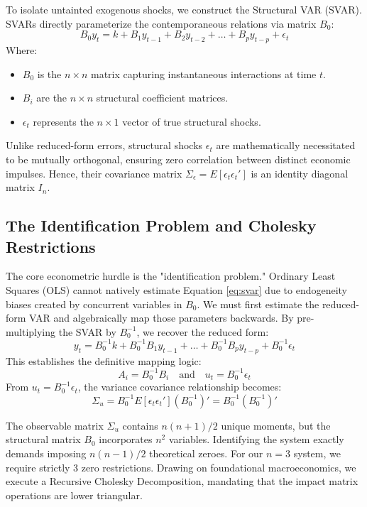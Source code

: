 \documentclass[12pt,a4paper]{report}
\begin{document}
To isolate untainted exogenous shocks, we construct the Structural VAR (SVAR). SVARs directly parameterize the contemporaneous relations via matrix $B_0$:
\begin{equation} \label{eq:svar}
B_0 y_t = k + B_1 y_{t-1} + B_2 y_{t-2} + \dots + B_p y_{t-p} + \epsilon_t
\end{equation}
Where:
\begin{itemize}
    \item $B_0$ is the $n \times n$ matrix capturing instantaneous interactions at time $t$.
    \item $B_i$ are the $n \times n$ structural coefficient matrices.
    \item $\epsilon_t$ represents the $n \times 1$ vector of true structural shocks.
\end{itemize}

Unlike reduced-form errors, structural shocks $\epsilon_t$ are mathematically necessitated to be mutually orthogonal, ensuring zero correlation between distinct economic impulses. Hence, their covariance matrix $\Sigma_\epsilon = E[\epsilon_t \epsilon_t']$ is an identity diagonal matrix $I_n$. 

\subsection{The Identification Problem and Cholesky Restrictions}
The core econometric hurdle is the "identification problem." Ordinary Least Squares (OLS) cannot natively estimate Equation \ref{eq:svar} due to endogeneity biases created by concurrent variables in $B_0$. We must first estimate the reduced-form VAR and algebraically map those parameters backwards. By pre-multiplying the SVAR by $B_0^{-1}$, we recover the reduced form:
\begin{equation}
y_t = B_0^{-1}k + B_0^{-1}B_1 y_{t-1} + \dots + B_0^{-1}B_p y_{t-p} + B_0^{-1}\epsilon_t
\end{equation}
This establishes the definitive mapping logic:
\begin{equation}
A_i = B_0^{-1}B_i \quad \text{and} \quad u_t = B_0^{-1}\epsilon_t
\end{equation}
From $u_t = B_0^{-1}\epsilon_t$, the variance covariance relationship becomes:
\begin{equation}
\Sigma_u = B_0^{-1} E[\epsilon_t \epsilon_t'] (B_0^{-1})' = B_0^{-1} (B_0^{-1})'
\end{equation}

The observable matrix $\Sigma_u$ contains $n(n+1)/2$ unique moments, but the structural matrix $B_0$ incorporates $n^2$ variables. Identifying the system exactly demands imposing $n(n-1)/2$ theoretical zeroes. For our $n=3$ system, we require strictly 3 zero restrictions. Drawing on foundational macroeconomics, we execute a Recursive Cholesky Decomposition, mandating that the impact matrix operations are lower triangular.
\end{document}
